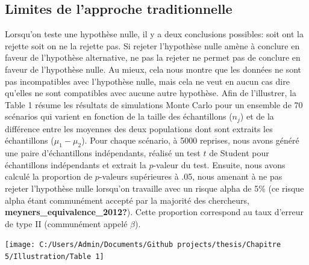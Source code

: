\documentclass[
  english,
  man]{apa6}
\begin{document}
\hypertarget{limites-de-lapproche-traditionnelle}{%
\subsection{Limites de l'approche traditionnelle}\label{limites-de-lapproche-traditionnelle}}

Lorsqu'on teste une hypothèse nulle, il y a deux conclusions possibles: soit ont la rejette soit on ne la rejette pas. Si rejeter l'hypothèse nulle amène à conclure en faveur de l'hypothèse alternative, ne pas la rejeter ne permet pas de conclure en faveur de l'hypothèse nulle. Au mieux, cela nous montre que les données ne sont pas incompatibles avec l'hypothèse nulle, mais cela ne veut en aucun cas dire qu'elles ne sont compatibles avec aucune autre hypothèse. Afin de l'illustrer, la Table 1 résume les résultats de simulations Monte Carlo pour un ensemble de 70 scénarios qui varient en fonction de la taille des échantillons (\(n_j\)) et de la différence entre les moyennes des deux populations dont sont extraits les échantillons (\(\mu_1-\mu_2\)). Pour chaque scénario, à 5000 reprises, nous avons généré une paire d'échantillons indépendants, réalisé un test \(t\) de Student pour échantillons indépendants et extrait la \(p\)-valeur du test. Ensuite, nous avons calculé la proportion de \(p\)-valeurs supérieures à .05, nous amenant à ne pas rejeter l'hypothèse nulle lorsqu'on travaille avec un risque alpha de 5\% (ce risque alpha étant communément accepté par la majorité des chercheurs, \textbf{meyners\_equivalence\_2012?}). Cette proportion correspond au taux d'erreur de type II (communément appelé \(\beta\)).

\begin{center}\texttt{[image: C:/Users/Admin/Documents/Github projects/thesis/Chapitre 5/Illustration/Table 1]} \end{center}
\end{document}
